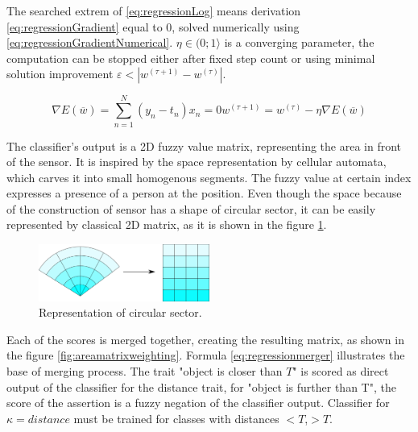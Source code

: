 The searched extrem of \ref{eq:regressionLog} means derivation \ref{eq:regressionGradient}
equal to $0$, solved numerically using \ref{eq:regressionGradientNumerical}.
$\eta \in (0;1\rangle$ is a converging parameter, the computation can be stopped either after
fixed step count or using minimal solution improvement $\varepsilon < | w^{(\tau + 1)} - w^{(\tau)} |$.

\begin{subequations}
\begin{equation}
\nabla E(\overline{w}) = \sum_{n=1}^N (y_n - t_n)x_n = 0
\label{eq:regressionGradient}
\end{equation}
\begin{equation}
w^{(\tau + 1)} = w^{(\tau)} - \eta \nabla E(\overline{w})
\label{eq:regressionGradientNumerical}
\end{equation}
\end{subequations}

The classifier's output is a 2D fuzzy value matrix, representing the area in front of the sensor.
It is inspired by the space representation by cellular automata, which carves it into small
homogenous segments. The fuzzy value at certain index expresses a presence of a person
at the position. Even though the space because of the construction of sensor has a shape of
circular sector, it can be easily represented by classical 2D matrix, as it is shown in the figure \ref{fig:circularsector}.

\begin{figure}[h!]
\begin{center}
\includegraphics[width=0.5\textwidth]{img/circularsector_transformation.png}
\caption{Representation of circular sector.\label{fig:circularsector}}
\end{center}
\end{figure}

Each of the scores is merged together, creating the resulting matrix, as shown
in the figure \ref{fig:areamatrixweighting}. Formula \ref{eq:regressionmerger} illustrates
the base of merging process. The trait "object is closer than $T$" is scored as 
direct output of the classifier for the distance trait, for "object is further than T",
the score of the assertion is a fuzzy negation of the classifier output.
Classifier for $\kappa = distance$ must be trained for classes with distances $<T$,$>T$.

